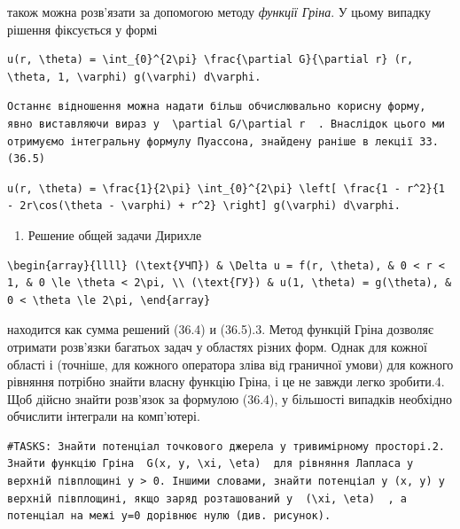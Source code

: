 \documentclass[
  ukrainian,
]{article}
\providecommand{\tightlist}{%
  \setlength{\itemsep}{0pt}\setlength{\parskip}{0pt}}
\begin{document}
також можна розв'язати за допомогою методу \emph{функції Гріна}. У цьому
випадку рішення фіксується у формі

\begin{verbatim}
u(r, \theta) = \int_{0}^{2\pi} \frac{\partial G}{\partial r} (r, \theta, 1, \varphi) g(\varphi) d\varphi.
\end{verbatim}

\begin{verbatim}
Останнє відношення можна надати більш обчислювально корисну форму, явно виставляючи вираз у  \partial G/\partial r  . Внаслідок цього ми отримуємо інтегральну формулу Пуассона, знайдену раніше в лекції 33.(36.5)
\end{verbatim}

\begin{verbatim}
u(r, \theta) = \frac{1}{2\pi} \int_{0}^{2\pi} \left[ \frac{1 - r^2}{1 - 2r\cos(\theta - \varphi) + r^2} \right] g(\varphi) d\varphi.
\end{verbatim}

\begin{enumerate}
\def\labelenumi{\arabic{enumi}.}
\setcounter{enumi}{1}
\tightlist
\item
  Решение общей задачи Дирихле
\end{enumerate}

\begin{verbatim}
\begin{array}{llll} (\text{УЧП}) & \Delta u = f(r, \theta), & 0 < r < 1, & 0 \le \theta < 2\pi, \\ (\text{ГУ}) & u(1, \theta) = g(\theta), & 0 < \theta \le 2\pi, \end{array}
\end{verbatim}

находится как сумма решений (36.4) и (36.5).3. Метод функцій Гріна
дозволяє отримати розв'язки багатьох задач у областях різних форм. Однак
для кожної області і (точніше, для кожного оператора зліва від граничної
умови) для кожного рівняння потрібно знайти власну функцію Гріна, і це
не завжди легко зробити.4. Щоб дійсно знайти розв'язок за формулою
(36.4), у більшості випадків необхідно обчислити інтеграли на
комп'ютері.

\begin{verbatim}
#TASKS: Знайти потенціал точкового джерела у тривимірному просторі.2. Знайти функцію Гріна  G(x, y, \xi, \eta)  для рівняння Лапласа у верхній півплощині y > 0. Іншими словами, знайти потенціал у (x, y) у верхній півплощині, якщо заряд розташований у  (\xi, \eta)  , а потенціал на межі y=0 дорівнює нулю (див. рисунок).
\end{verbatim}
\end{document}
